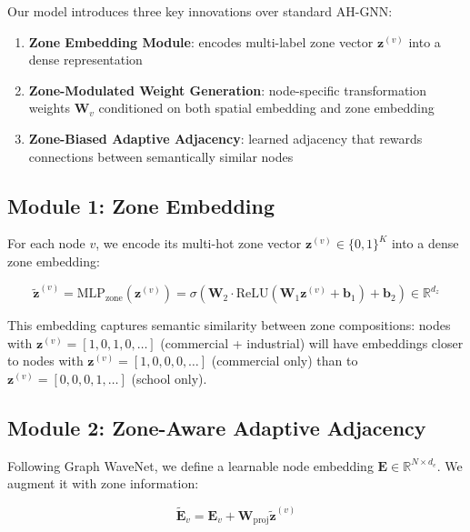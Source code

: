 \documentclass[12pt,a4paper]{article}
\begin{document}
Our model introduces three key innovations over standard AH-GNN:

\begin{enumerate}
    \item \textbf{Zone Embedding Module}: encodes multi-label zone vector
          $\mathbf{z}^{(v)}$ into a dense representation
    \item \textbf{Zone-Modulated Weight Generation}: node-specific transformation
          weights $\mathbf{W}_v$ conditioned on both spatial embedding and zone embedding
    \item \textbf{Zone-Biased Adaptive Adjacency}: learned adjacency that rewards
          connections between semantically similar nodes
\end{enumerate}

\subsection{Module 1: Zone Embedding}

For each node $v$, we encode its multi-hot zone vector
$\mathbf{z}^{(v)} \in \{0,1\}^K$ into a dense zone embedding:

\begin{equation}
\tilde{\mathbf{z}}^{(v)} = \text{MLP}_{\text{zone}}\!\left(\mathbf{z}^{(v)}\right)
= \sigma\!\left(\mathbf{W}_2 \cdot \text{ReLU}(\mathbf{W}_1 \mathbf{z}^{(v)} + \mathbf{b}_1) + \mathbf{b}_2\right)
\in \mathbb{R}^{d_z}
\end{equation}

This embedding captures semantic similarity between zone compositions:
nodes with $\mathbf{z}^{(v)} = [1,0,1,0,\ldots]$ (commercial + industrial) will
have embeddings closer to nodes with $\mathbf{z}^{(v)} = [1,0,0,0,\ldots]$
(commercial only) than to $\mathbf{z}^{(v)} = [0,0,0,1,\ldots]$ (school only).

\subsection{Module 2: Zone-Aware Adaptive Adjacency}

Following Graph WaveNet, we define a learnable node embedding
$\mathbf{E} \in \mathbb{R}^{N \times d_e}$. We augment it with zone information:

\begin{equation}
\tilde{\mathbf{E}}_v = \mathbf{E}_v + \mathbf{W}_{\text{proj}} \tilde{\mathbf{z}}^{(v)}
\end{equation}
\end{document}
